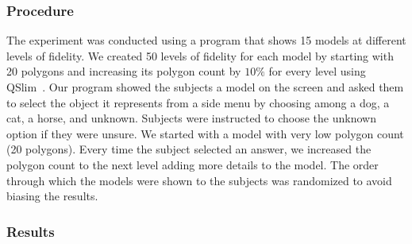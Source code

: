 \subsubsection{Procedure}
\label{sec:hrr:us:pts:pro}

The experiment was conducted using a program that shows 15 models at different levels of fidelity.  We created 50 levels of fidelity for each model by starting with 20 polygons and increasing its polygon count by $10\%$ for every level using QSlim~\cite{garland1997}. Our program showed the subjects a model on the screen and asked them to select the object it represents from a side menu by choosing among a dog, a cat, a horse, and unknown. Subjects were instructed to choose the unknown option if they were unsure. We started with a model with very low polygon count (20 polygons). Every time the subject selected an answer, we increased the polygon count to the next level adding more details to the model. The order through which the models were shown to the subjects was randomized to avoid biasing the results. 

\subsubsection{Results}
\label{sec:hrr:us:pts:r}

